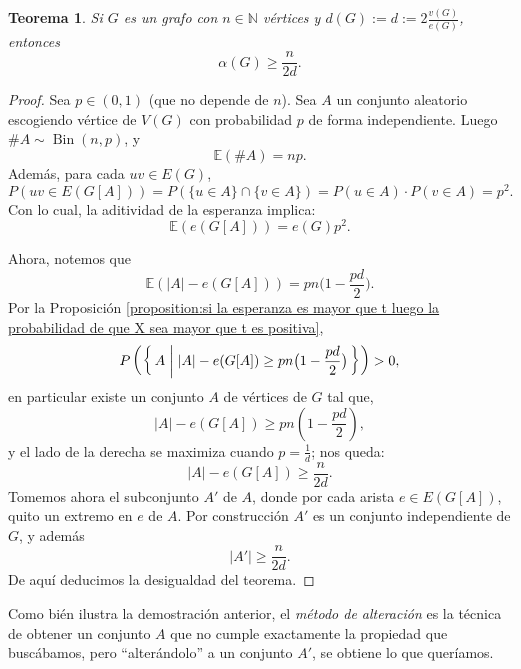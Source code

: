 \documentclass[12pt]{report}
\theoremstyle{plain}
\newtheorem{theorem}{Teorema}[section]
\theoremstyle{definition}
\newcommand{\naturals}{\mathbb{N}}
\newcommand{\abs}[1]{\left \vert #1 \right \vert}
\begin{document}
\begin{theorem}
Si $G$ es un grafo con $n \in \naturals$ vértices y $d(G) := d := 2 \frac{v(G)}{e(G)}$, entonces
\[
    \alpha (G) \geq \frac{n}{2 d}.
\]
\end{theorem}
\begin{proof}
Sea $p \in (0,1)$ (que no depende de $n$). Sea $A$ un conjunto aleatorio escogiendo vértice de $V(G)$ con probabilidad $p$ de forma independiente. Luego $\#A \sim \operatorname{Bin} (n,p)$, y
\[
    \mathbb{E}(\#A) = np.
\]
Además, para cada $uv \in E (G)$,
\[
    P (uv \in E(G[A])) = P(\{u \in A\} \cap \{v \in A\}) = P (u \in A) \cdot P (v \in A) = p^2.
\]
Con lo cual, la aditividad de la esperanza implica:
\[
    \mathbb{E} (e (G[A])) = e(G) p^2.
\]

Ahora, notemos que
\[
    \mathbb{E}(\abs A - e(G[A])) = pn \big(1 - \frac {pd}2 \big).
\]
Por la Proposición \ref{proposition:si la esperanza es mayor que t luego la probabilidad de que X sea mayor que t es positiva},
\[
    P \left (\Set {A | \abs{A} - e(G[A]  ) \geq p n \big ( 1 - \frac {pd}{2} \big ) } \right ) > 0,
\]
en particular existe un conjunto $A$ de vértices de $G$ tal que,
\[
    \abs A - e(G[A]) \geq pn (1 - \frac{pd}2),
\]
y el lado de la derecha se maximiza cuando $p = \frac 1 d$; nos queda:
\[
    \abs A - e(G[A]) \geq \frac{n}{2d}.
\]
Tomemos ahora el subconjunto $A'$ de $A$, donde por cada arista $e \in E(G[A])$, quito un extremo en $e$ de $A$. Por construcción $A'$ es un conjunto independiente de $G$, y además
\[
    \abs{A'} \geq \frac{n}{2d}.
\]
De aquí deducimos la desigualdad del teorema.
\end{proof}

Como bién ilustra la demostración anterior, el \textit{método de alteración} es la técnica de obtener un conjunto $A$ que no cumple exactamente la propiedad que buscábamos, pero ``alterándolo'' a un conjunto $A'$, se obtiene lo que queríamos.
\end{document}
